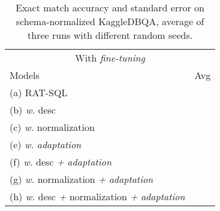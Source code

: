 \documentclass[11pt,a4paper]{article}
\newcommand{\systemname}{\mbox{KaggleDBQA}\xspace}
\begin{document}
\begin{table}[b]
    \small
    \centering
    \caption{Exact match accuracy and standard error on schema-normalized \systemname, average of three runs with different random seeds.}
    \label{tab:normalized}
    \vspace{-0.5\baselineskip}
    \begin{tabular}{lc}
        \toprule
        \multicolumn{2}{c}{With  \textit{fine-tuning}} \\
        Models  & Avg  \\
        \midrule
        (a) RAT-SQL  &    \\
        (b) \quad \textit{w.} desc  &   \\
        (c) \quad \textit{w.} normalization  &  \\
      
        (e) \quad \textit{w.} \textit{adaptation}   &   \\
        (f) \quad \textit{w.} desc \textit{+} \textit{adaptation}  & \\
        (g) \quad \textit{w.} normalization \textit{+} \textit{adaptation}  &  \\
        (h) \quad \textit{w.} desc \textit{+} normalization \textit{+} \textit{adaptation}  &   \\
        \bottomrule
    \end{tabular}
\end{table}
\end{document}
